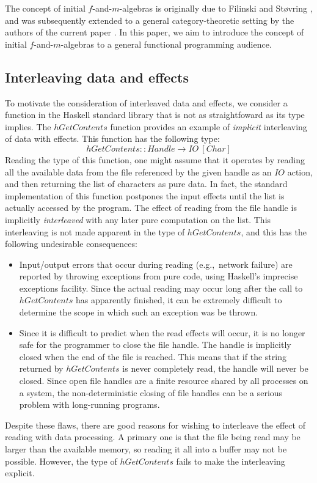 \documentclass{jfp1}
\begin{document}
The concept of initial $f$-and-$m$-algebras is originally due to
Filinski and St\o{}vring \cite{filinski07inductive}, and was
subsequently extended to a general category-theoretic setting by the
authors of the current paper \cite{atkey12fibrational}. In this paper,
we aim to introduce the concept of initial $f$-and-$m$-algebras to a
general functional programming audience.

\subsection{Interleaving data and effects}
\label{sec:motivate-interleaving}

To motivate the consideration of interleaved data and effects, we
consider a function in the Haskell standard library that is not as
straightfoward as its type implies. The $\mathit{hGetContents}$
function provides an example of \emph{implicit} interleaving of data
with effects. This function has the following type:
\begin{displaymath}
  \mathit{hGetContents} :: \mathit{Handle} \to \mathit{IO}~[\mathit{Char}]
\end{displaymath}
Reading the type of this function, one might assume that it operates
by reading all the available data from the file referenced by the
given handle as an $\mathit{IO}$ action, and then returning the list
of characters as pure data. In fact, the standard implementation of
this function postpones the input effects until the list is actually
accessed by the program. The effect of reading from the file handle is
implicitly \emph{interleaved} with any later pure computation on the
list. This interleaving is not made apparent in the type of
$\mathit{hGetContents}$, and this has the following undesirable
consequences:
\begin{itemize}
\item Input/output errors that occur during reading (e.g.,~network
  failure) are reported by throwing exceptions from pure code, using
  Haskell's imprecise exceptions facility. Since the actual reading
  may occur long after the call to $\mathit{hGetContents}$ has
  apparently finished, it can be extremely difficult to determine the
  scope in which such an exception was be thrown.
\item Since it is difficult to predict when the read effects will
  occur, it is no longer safe for the programmer to close the file
  handle. The handle is implicitly closed when the end of the file is
  reached. This means that if the string returned by
  $\mathit{hGetContents}$ is never completely read, the handle will
  never be closed. Since open file handles are a finite resource
  shared by all processes on a system, the non-deterministic closing
  of file handles can be a serious problem with long-running programs.
\end{itemize}
Despite these flaws, there are good reasons for wishing to interleave
the effect of reading with data processing. A primary one is that the
file being read may be larger than the available memory, so reading it
all into a buffer may not be possible. However, the type of
$\mathit{hGetContents}$ fails to make the interleaving explicit.
\end{document}
